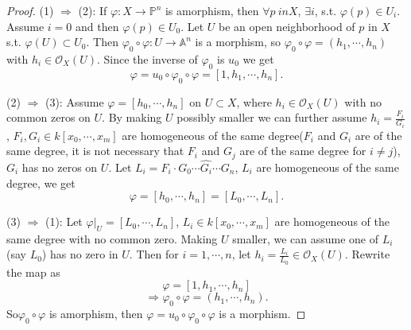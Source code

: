 \begin{proof}
	(1) $ \Rightarrow $ (2): If $ \varphi:X\to \mathbb{P}^n $ is amorphism, then $ \forall p\ in X $, $ \exists i $, s.t. $ \varphi (p) \in U_i$. Assume $ i=0 $ and then $ \varphi(p)\in U_0 $. Let $ U $ be an open neighborhood of $ p $ in $ X $ s.t. $ \varphi (U)\subset U_0 $. Then  $ \varphi _0\circ \varphi :U\to \mathbb{A}^n $ is a morphism,  so $ \varphi_0\circ\varphi = (h_1,\cdots,h_n) $ with $ h_i\in \mathcal{O}_X(U) $. Since the inverse of $ \varphi_0 $ is $ u_0 $ we get
	\begin{equation}
		\varphi = u_0\circ \varphi_0\circ\varphi = [1,h_1,\cdots,h_n].
	\end{equation}

	(2) $ \Rightarrow $ (3): Assume $ \varphi = [h_0,\cdots,h_n] $ on $ U\subset X $, where $ h_i \in \mathcal{O}_X(U)$ with no common zeros on $ U $. By making $ U $ possibly smaller we can further assume $ h_i=\frac{F_i}{G_i} $, $ F_i,G_i\in k[x_0,\cdots,x_m] $ are homogeneous of the same degree($ F_i $ and $ G_i $ are of the same degree, it is not necessary that $ F_i $ and $ G_j $ are of the same degree for $ i\neq j $), $ G_i $ has no zeros on $ U $. Let $ L_i= F_i\cdot G_0\cdots \hat{G_i}\cdots G_n $, $ L_i $ are homogeneous of the same degree, we get
	\begin{equation}
		\varphi = [h_0,\cdots,h_n]=[L_0,\cdots,L_n].
	\end{equation}

	(3) $ \Rightarrow $ (1): Let $ \varphi |_U=[L_0,\cdots,L_n] $, $ L_i\in k[x_0,\cdots,x_m] $ are homogeneous of the same degree with no common zero. Making $ U $ smaller, we can assume one of $ L_i $(say $ L_0 $) has no zero in $ U $. Then for  $ i=1,\cdots,n $, let $ h_i=\frac{L_i}{L_0}\in \mathcal{O}_X (U) $. Rewrite the map as
	\begin{equation}
		\varphi = [1,h_1,\cdots,h_n]
	\end{equation}
	\begin{equation}
		\Rightarrow	\varphi_0\circ\varphi = (h_1,\cdots,h_n).
	\end{equation}
	So$ \varphi_0\circ\varphi $ is amorphism, then $ \varphi = u_0\circ\varphi_0\circ\varphi $ is a morphism.
\end{proof}
